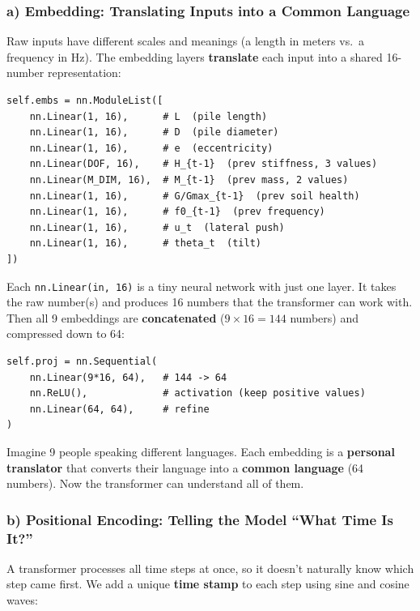 \documentclass[11pt,a4paper]{article}
\begin{document}
\subsubsection{a) Embedding: Translating Inputs into a Common Language}

Raw inputs have different scales and meanings (a length in meters
vs.\ a frequency in Hz).  The embedding layers \textbf{translate} each
input into a shared 16-number representation:

\begin{lstlisting}
self.embs = nn.ModuleList([
    nn.Linear(1, 16),      # L  (pile length)
    nn.Linear(1, 16),      # D  (pile diameter)
    nn.Linear(1, 16),      # e  (eccentricity)
    nn.Linear(DOF, 16),    # H_{t-1}  (prev stiffness, 3 values)
    nn.Linear(M_DIM, 16),  # M_{t-1}  (prev mass, 2 values)
    nn.Linear(1, 16),      # G/Gmax_{t-1}  (prev soil health)
    nn.Linear(1, 16),      # f0_{t-1}  (prev frequency)
    nn.Linear(1, 16),      # u_t  (lateral push)
    nn.Linear(1, 16),      # theta_t  (tilt)
])
\end{lstlisting}

Each \texttt{nn.Linear(in, 16)} is a tiny neural network with just
one layer.  It takes the raw number(s) and produces 16 numbers that
the transformer can work with.  Then all 9 embeddings are
\textbf{concatenated} ($9 \times 16 = 144$ numbers) and compressed
down to 64:

\begin{lstlisting}
self.proj = nn.Sequential(
    nn.Linear(9*16, 64),   # 144 -> 64
    nn.ReLU(),             # activation (keep positive values)
    nn.Linear(64, 64),     # refine
)
\end{lstlisting}

\begin{analogybox}
Imagine 9 people speaking different languages.  Each embedding is a
\textbf{personal translator} that converts their language into a
\textbf{common language} (64 numbers).  Now the transformer can
understand all of them.
\end{analogybox}

\subsubsection{b) Positional Encoding: Telling the Model ``What Time Is It?''}

A transformer processes all time steps at once, so it doesn't
naturally know which step came first.  We add a unique
\textbf{time stamp} to each step using sine and cosine waves:
\end{document}
